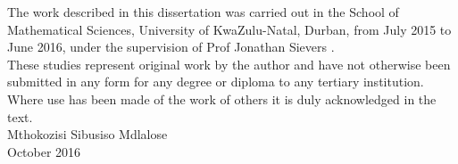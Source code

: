 \noindent
The work described in this dissertation was carried out in the School of Mathematical Sciences, 
University of KwaZulu-Natal, Durban, from July 2015 to June 2016, under the supervision of Prof Jonathan Sievers .\\


\noindent
These studies represent original work by the author and have not otherwise been submitted in any form for 
any degree or diploma to any tertiary institution. Where use has been made of the work of others it is 
duly acknowledged in the text.\\

\noindent
Mthokozisi Sibusiso Mdlalose\\

\noindent
October 2016
